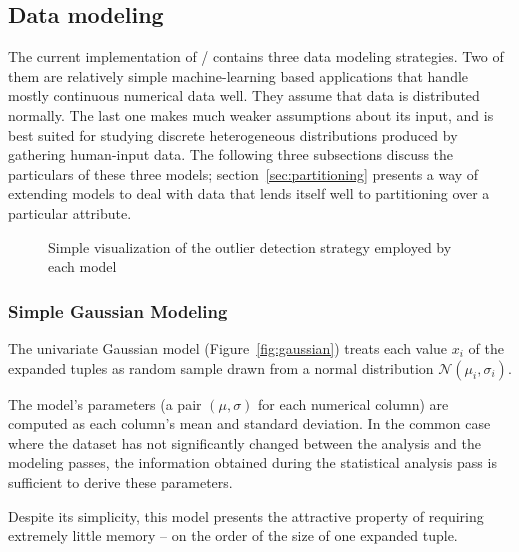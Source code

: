 \subsection{Data modeling}
\label{sec:model-creation}

The current implementation of \dBoost/ contains three data modeling strategies. Two of them are relatively simple machine-learning based applications that handle mostly continuous numerical data well.
They assume that data is distributed normally.
The last one makes much weaker assumptions about its input, and is best suited for studying discrete heterogeneous distributions produced by gathering human-input data. The following three subsections discuss the particulars of these three models; section~\ref{sec:partitioning} presents a way of extending models to deal with data that lends itself well to partitioning over a particular attribute.

\begin{figure}
  \centering
  \newcommand{\cramped}[3]{\subfloat[#2]{\texttt{[image: \#1]}\label{fig:#3}}}
  \cramped{../graphics/gaussians-preview.pdf}{Gaussian}{gaussian}\hspace*{.01\linewidth}
  \cramped{../graphics/mixtures-preview.png}{Mixture}{mixture}\hspace*{.01\linewidth}
  \cramped{../graphics/histograms-preview.pdf}{Histogram}{histogram}
  \caption{Simple visualization of the outlier detection strategy employed by each model}
  \label{fig:models}
\end{figure}

\subsubsection{Simple Gaussian Modeling}
\label{sec:gaus_model}
The univariate Gaussian model (Figure~\ref{fig:gaussian}) treats each value $x_i$ of the expanded tuples as random sample drawn from a normal distribution $\mathcal N(\mu_i, \sigma_i)$.

The model's parameters (a pair $(\mu, \sigma)$ for each numerical column) are computed as each column's mean and standard deviation. In the common case where the dataset has not significantly changed between the analysis and the modeling passes, the information obtained during the statistical analysis pass is sufficient to derive these parameters.

Despite its simplicity, this model presents the attractive property of requiring extremely little memory -- on the order of the size of one expanded tuple.

